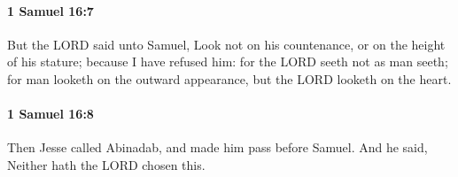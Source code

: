 		\paragraph{1 Samuel 16:7} %
			\label{1SAMUEL-16-7}

			But the LORD said unto Samuel, Look not on his countenance, or on the height of his stature; because I have refused him: for the LORD seeth not as man seeth; for man looketh on the outward appearance, but the LORD looketh on the heart.


		\paragraph{1 Samuel 16:8} %
			\label{1SAMUEL-16-8}

			Then Jesse called Abinadab, and made him pass before Samuel. And he said, Neither hath the LORD chosen this.



